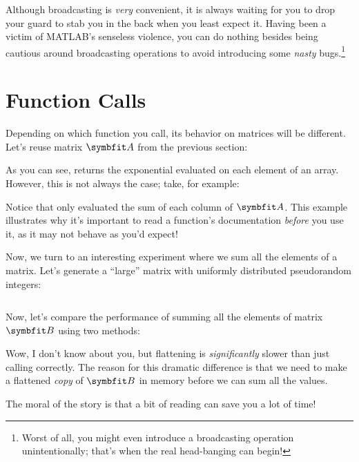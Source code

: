 \documentclass{article}
\begin{document}
Although broadcasting is \emph{very} convenient, it is always waiting
for you to drop your guard to stab you in the back when you least expect
it.  Having been a victim of MATLAB's senseless violence, you can do
nothing besides being cautious around broadcasting operations to avoid
introducing some \emph{nasty} bugs.\footnote{Worst of all, you might
even introduce a broadcasting operation unintentionally; that's when
the real head-banging can begin!}

\section{Function Calls}

Depending on which function you call, its behavior on matrices will be
different.  Let's reuse matrix \(\mat{A}\) from the previous section:


As you can see,  returns the exponential evaluated on each element of an
array. However, this is not always the case; take, for example:


Notice that  only evaluated the sum of each column of \(\mat{A}\). This
example illustrates why it's important to read a function's
documentation \emph{before} you use it, as it may not behave as you'd
expect!

Now, we turn to an interesting experiment where we sum all the elements
of a matrix. Let's generate a \enquote{large} matrix with uniformly
distributed pseudorandom integers:

\inputminted{matlab}{02-vectorization.d/randi.m}

Now, let's compare the performance of summing all the elements of matrix
\(\mat{B}\) using two methods:



Wow, I don't know about you, but flattening is \emph{significantly}
slower than just calling  correctly.  The reason for this dramatic
difference is that we need to make a flattened \emph{copy} of
\(\mat{B}\) in memory before we can sum all the values.

The moral of the story is that a bit of reading can save you a lot of
time!
\end{document}
